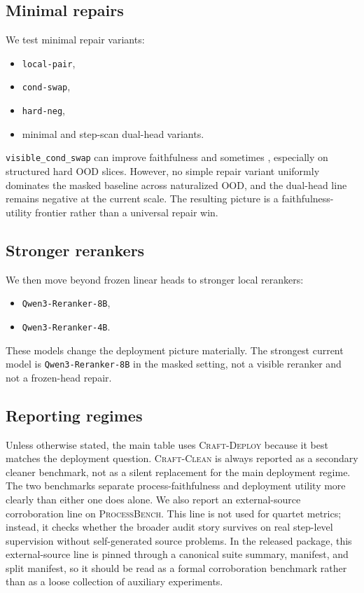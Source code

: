 \subsection{Minimal repairs}

We test minimal repair variants:
\begin{itemize}[leftmargin=1.5em]
\item \texttt{local-pair},
\item \texttt{cond-swap},
\item \texttt{hard-neg},
\item minimal and step-scan dual-head variants.
\end{itemize}
\texttt{visible\_cond\_swap} can improve faithfulness and sometimes \amcd,
especially on structured hard OOD slices. However, no simple repair variant
uniformly dominates the masked baseline across naturalized OOD, and the
dual-head line remains negative at the current scale. The resulting picture is
a faithfulness-utility frontier rather than a universal repair win.

\subsection{Stronger rerankers}

We then move beyond frozen linear heads to stronger local rerankers:
\begin{itemize}[leftmargin=1.5em]
\item \texttt{Qwen3-Reranker-8B},
\item \texttt{Qwen3-Reranker-4B}.
\end{itemize}
These models change the deployment picture materially. The strongest current
model is \texttt{Qwen3-Reranker-8B} in the masked setting, not a visible
reranker and not a frozen-head repair.

\subsection{Reporting regimes}

Unless otherwise stated, the main table uses \textsc{Craft-Deploy} because it
best matches the deployment question. \textsc{Craft-Clean} is always
reported as a secondary cleaner benchmark, not as a silent replacement for the
main deployment regime. The two benchmarks separate process-faithfulness and
deployment utility more clearly than either one does alone. We also report an
external-source corroboration line on \textsc{ProcessBench}. This line is not
used for quartet metrics; instead, it checks whether the broader audit story
survives on real step-level supervision without self-generated source
problems. In the released package, this external-source line is pinned through
a canonical suite summary, manifest, and split manifest, so it should be read
as a formal corroboration benchmark rather than as a loose collection of
auxiliary experiments.
